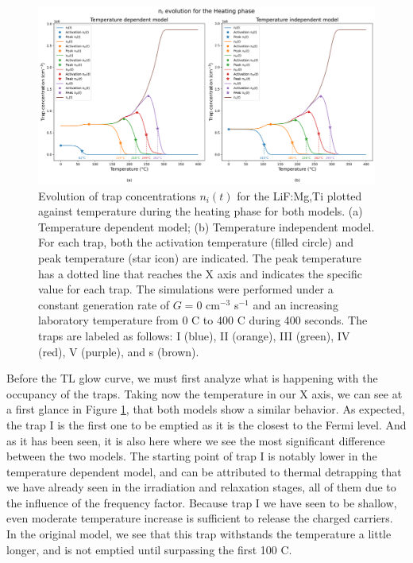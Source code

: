 \begin{figure}[ht]
    \centering
    \includegraphics[width=\textwidth]{Images/GC_ActivationAndPeakTemperatures.png}
    \caption[Trap occupancy evolution during the heating phase for both models, showing activation and peak temperatures for every trap.]{Evolution of trap concentrations $n_i(t)$ for the LiF:Mg,Ti plotted against temperature during the heating phase for both models. (a) Temperature dependent model; (b) Temperature independent model. For each trap, both the activation temperature (filled circle) and peak temperature (star icon) are indicated. The peak temperature has a dotted line that reaches the X axis and indicates the specific value for each trap. The simulations were performed under a constant generation rate of $G = 0$ cm$^{-3}$ s$^{-1}$ and an increasing laboratory temperature from 0 \textdegree C to 400 \textdegree C during 400 seconds. The traps are labeled as follows: I (blue), II (orange), III (green), IV (red), V (purple), and s (brown).}
    \label{fig:GC_ActivationAndPeakTemperatures}
\end{figure}

\vspace{10pt}
Before the TL glow curve, we must first analyze what is happening with the occupancy of the traps. Taking now the temperature in our X axis, we can see at a first glance in Figure \ref{fig:GC_ActivationAndPeakTemperatures}, that both models show a similar behavior. As expected, the trap I is the first one to be emptied as it is the closest to the Fermi level. And as it has been seen, it is also here where we see the most significant difference between the two models. The starting point of trap I is notably lower in the temperature dependent model, and can be attributed to thermal detrapping that we have already seen in the irradiation and relaxation stages, all of them due to the influence of the frequency factor. Because trap I we have seen to be shallow, even moderate temperature increase is sufficient to release the charged carriers. In the original model, we see that this trap withstands the temperature a little longer, and is not emptied until surpassing the first 100 \textdegree C. 

